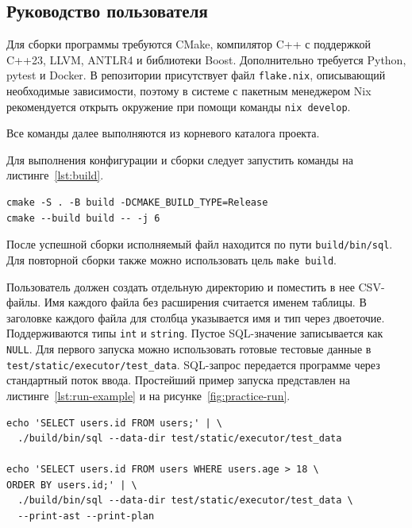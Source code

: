 \documentclass[14pt, russian]{scrartcl}
\begin{document}
\subsection{Руководство пользователя}

Для сборки программы требуются CMake, компилятор C++ с поддержкой C++23, LLVM,
ANTLR4 и библиотеки Boost. Дополнительно требуется Python, pytest и Docker. В
репозитории присутствует файл \texttt{flake.nix}, описывающий необходимые
зависимости, поэтому в системе с пакетным менеджером Nix рекомендуется открыть
окружение при помощи команды \verb|nix develop|.

Все команды далее выполняются из корневого каталога проекта.

Для выполнения конфигурации и сборки следует запустить команды на
листинге~\ref{lst:build}.

\begin{listing}[H]
  \caption{Конфигурация и сборка проекта.}
  \label{lst:build}
  \begin{verbatim}
cmake -S . -B build -DCMAKE_BUILD_TYPE=Release
cmake --build build -- -j 6
  \end{verbatim}
\end{listing}

После успешной сборки исполняемый файл находится по пути
\texttt{build/bin/sql}. Для повторной сборки также можно использовать цель
\texttt{make build}.

Пользователь должен создать отдельную директорию и поместить в нее CSV-файлы.
Имя каждого файла без расширения считается именем таблицы. В заголовке каждого
файла для столбца указывается имя и тип через двоеточие. Поддерживаются типы
\texttt{int} и \texttt{string}. Пустое SQL-значение записывается как
\texttt{NULL}. Для первого запуска можно использовать готовые тестовые данные в
\verb|test/static/executor/test_data|. SQL-запрос передается программе через
стандартный поток ввода. Простейший пример запуска представлен на
листинге~\ref{lst:run-example} и на рисунке~\ref{fig:practice-run}.

\begin{listing}[H]
  \caption{Примеры команд для запуска программы.}
  \label{lst:run-example}
  \begin{verbatim}
echo 'SELECT users.id FROM users;' | \
  ./build/bin/sql --data-dir test/static/executor/test_data

echo 'SELECT users.id FROM users WHERE users.age > 18 \
ORDER BY users.id;' | \
  ./build/bin/sql --data-dir test/static/executor/test_data \
  --print-ast --print-plan
  \end{verbatim}
\end{listing}
\end{document}
